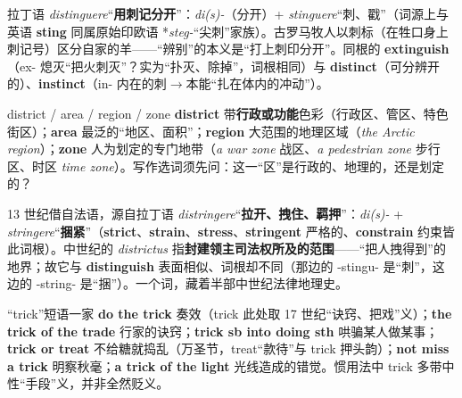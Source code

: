 \documentclass[../main.tex]{subfiles}
\begin{document}
\begin{origin}
拉丁语 \textit{distinguere}“\textbf{用刺记分开}”：\textit{di(s)-}（分开）+ \textit{stinguere}“刺、戳”（词源上与英语 \textbf{sting} 同属原始印欧语 *\textit{steg-}“尖刺”家族）。古罗马牧人以刺标（在牲口身上刺记号）区分自家的羊——“辨别”的本义是“打上刺印分开”。同根的 \textbf{extinguish}（ex- 熄灭“把火刺灭”？实为“扑灭、除掉”，词根相同）与 \textbf{distinct}（可分辨开的）、\textbf{instinct}（in- 内在的刺$\to$本能“扎在体内的冲动”）。
\end{origin}



\begin{lex}{district / area / region / zone}
\textbf{district} 带\textbf{行政或功能}色彩（行政区、管区、特色街区）；\textbf{area} 最泛的“地区、面积”；\textbf{region} 大范围的地理区域（\textit{the Arctic region}）；\textbf{zone} 人为划定的专门地带（\textit{a war zone} 战区、\textit{a pedestrian zone} 步行区、时区 \textit{time zone}）。写作选词须先问：这一“区”是行政的、地理的，还是划定的？
\end{lex}

\begin{origin}
13 世纪借自法语，源自拉丁语 \textit{distringere}“\textbf{拉开、拽住、羁押}”：\textit{di(s)-} + \textit{stringere}“\textbf{捆紧}”（\textbf{strict}、\textbf{strain}、\textbf{stress}、\textbf{stringent} 严格的、\textbf{constrain} 约束皆此词根）。中世纪的 \textit{districtus} 指\textbf{封建领主司法权所及的范围}——“把人拽得到”的地界；故它与 \textbf{distinguish} 表面相似、词根却不同（那边的 -stingu- 是“刺”，这边的 -string- 是“捆”）。一个词，藏着半部中世纪法律地理史。
\end{origin}



\begin{gram}{“trick”短语一家}
\textbf{do the trick} 奏效（trick 此处取 17 世纪“诀窍、把戏”义）；\textbf{the trick of the trade} 行家的诀窍；\textbf{trick sb into doing sth} 哄骗某人做某事；\textbf{trick or treat} 不给糖就捣乱（万圣节，treat“款待”与 trick 押头韵）；\textbf{not miss a trick} 明察秋毫；\textbf{a trick of the light} 光线造成的错觉。惯用法中 trick 多带中性“手段”义，并非全然贬义。
\end{gram}
\end{document}
